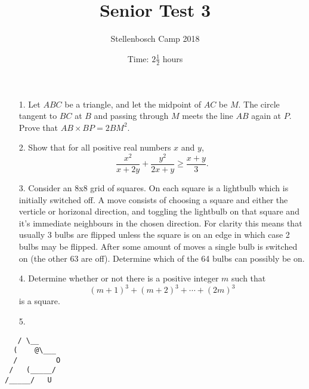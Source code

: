 \documentclass[a4paper, 11pt]{article}
\title{Senior Test 3}
\author{Stellenbosch Camp 2018}
\date{Time: $2 \frac{1}{2}$ hours}
\begin{document}
 \maketitle

\begin{enumerate}

\item[1.] Let $ABC$ be a triangle, and let the midpoint of $AC$ be $M$. The circle tangent to $BC$ at $B$ and passing through $M$ meets the line $AB$ again at $P$. Prove that $AB \times BP = 2 BM^2$.


\vspace{6pt}
\item[2.]
Show that for all positive real numbers $x$ and $y$, \[ \frac{x^2}{x+2y} +\frac{y^2}{2x+y} \geq \frac{x+y}{3}. \]


\item[3.]
Consider an 8x8 grid of squares. On each square is a lightbulb which is initially switched off. A move consists of choosing a square and either the verticle or horizonal direction, and toggling the lightbulb on that square and it's immediate neighbours in the chosen direction. For clarity this means that usually 3 bulbs are flipped unless the square is on an edge in which case 2 bulbs may be flipped. After some amount of moves a single bulb is switched on (the other 63 are off). Determine which of the 64 bulbs can possibly be on. 


\vspace{6pt}
\item[4.]
Determine whether or not there is a positive integer $m$ such that \[ (m+1)^3 +(m+2)^3 +\dotsb +(2m)^3 \] is a square.


\vspace{6pt}
% 
\item[5.]


\end{enumerate}

\vfill

\centering
\begin{BVerbatim}
   / \__
  (    @\___
  /         O
 /   (_____/
/_____/   U
\end{BVerbatim}

\vspace{12mm}
\end{document}
